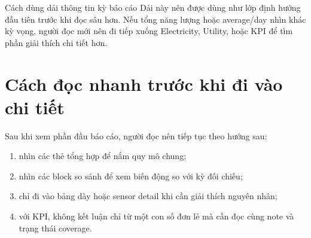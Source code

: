 \begin{ReaderNote}{Cách dùng dải thông tin kỳ báo cáo}
Dải này nên được dùng như lớp định hướng đầu tiên trước khi đọc sâu hơn. Nếu tổng năng lượng hoặc average/day nhìn khác kỳ vọng, người đọc mới nên đi tiếp xuống Electricity, Utility, hoặc KPI để tìm phần giải thích chi tiết hơn.
\end{ReaderNote}

\section{Cách đọc nhanh trước khi đi vào chi tiết}

Sau khi xem phần đầu báo cáo, người đọc nên tiếp tục theo hướng sau:

\begin{enumerate}[label=-]
\item nhìn các thẻ tổng hợp để nắm quy mô chung;
\item nhìn các block so sánh để xem biến động so với kỳ đối chiếu;
\item chỉ đi vào bảng dày hoặc sensor detail khi cần giải thích nguyên nhân;
\item với KPI, không kết luận chỉ từ một con số đơn lẻ mà cần đọc cùng note và trạng thái coverage.
\end{enumerate}

